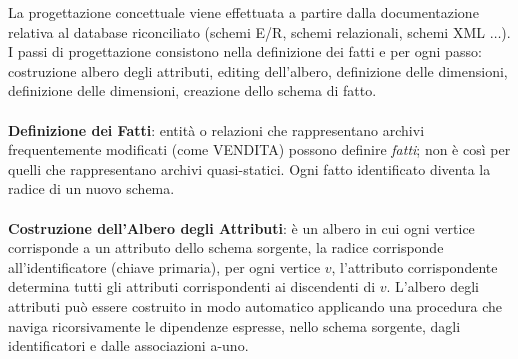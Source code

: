 \documentclass[a4paper, notitlepage, 9pt]{extreport}
\begin{document}
La progettazione concettuale viene effettuata a partire dalla documentazione relativa al database riconciliato (schemi E/R, schemi relazionali, schemi XML $\dots$). I passi di progettazione consistono nella definizione dei fatti e per ogni passo: costruzione albero degli attributi, editing dell'albero, definizione delle dimensioni, definizione delle dimensioni, creazione dello schema di fatto.
\\\\
\textbf{Definizione dei Fatti}: entità o relazioni che rappresentano archivi frequentemente modificati (come VENDITA) possono definire \textit{fatti}; non è così per quelli che rappresentano archivi quasi-statici. Ogni fatto identificato diventa la radice di un nuovo schema.
\\\\
\textbf{Costruzione dell'Albero degli Attributi}: è un albero in cui ogni vertice corrisponde a un attributo dello schema sorgente, la radice corrisponde all'identificatore (chiave primaria), per ogni vertice $v$, l'attributo corrispondente determina tutti gli attributi corrispondenti ai discendenti di $v$. L’albero degli attributi può essere costruito in modo automatico applicando una procedura che naviga ricorsivamente le dipendenze espresse, nello schema sorgente, dagli identificatori e dalle associazioni a-uno.
\end{document}
